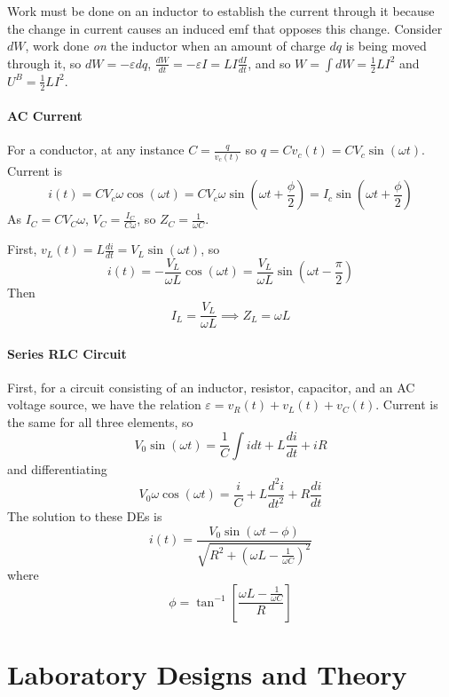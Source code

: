 \documentclass[12pt, a4paper, oneside, openright, titlepage]{book}
\begin{document}
Work must be done on an inductor to establish the current through it because the change in current causes an induced emf that opposes this change. Consider $dW$, work done \emph{on} the inductor when an amount of charge $dq$ is being moved through it, so $dW = -\varepsilon dq$, $\frac{dW}{dt} = -\varepsilon I = LI\frac{dI}{dt}$, and so $W = \int dW = \frac{1}{2}LI^2$ and $U^B = \frac{1}{2}LI^2$.

\subsection{AC Current}

For a conductor, at any instance $C = \frac{q}{v_c(t)}$ so $q = Cv_c(t) = CV_c\sin(\omega t)$. Current is $$i(t) = CV_c\omega \cos(\omega t) = CV_c\omega\sin\left(\omega t + \frac{\phi}{2}\right) = I_c\sin\left(\omega t+\frac{\phi}{2}\right)$$ As $I_C = CV_C\omega$, $V_C = \frac{I_C}{C\omega}$, so $Z_C = \frac{1}{\omega C}$.

First, $v_L(t) = L\frac{di}{dt} = V_L\sin(\omega t)$, so $$i(t) = -\frac{V_L}{\omega L}\cos(\omega t) = \frac{V_L}{\omega L}\sin\left(\omega t -\frac{\pi}{2}\right)$$ Then $$I_L = \frac{V_L}{\omega L}\implies Z_L = \omega L$$

\subsection{Series RLC Circuit}

First, for a circuit consisting of an inductor, resistor, capacitor, and an AC voltage source, we have the relation $\varepsilon = v_R(t) + v_L(t) + v_C(t)$. Current is the same for all three elements, so $$V_0\sin(\omega t) = \frac{1}{C}\int idt + L\frac{di}{dt}+iR$$ and differentiating $$V_0\omega \cos(\omega t) = \frac{i}{C} + L\frac{d^2i}{dt^2} + R\frac{di}{dt}$$ The solution to these DEs is $$i(t) = \frac{V_0\sin(\omega t-\phi)}{\sqrt{R^2 + \left(\omega L - \frac{1}{\omega C}\right)^2}}$$ where $$\phi = \tan^{-1}\left[\frac{\omega L - \frac{1}{\omega C}}{R}\right]$$



\part{Laboratory Designs and Theory}

\end{document}
